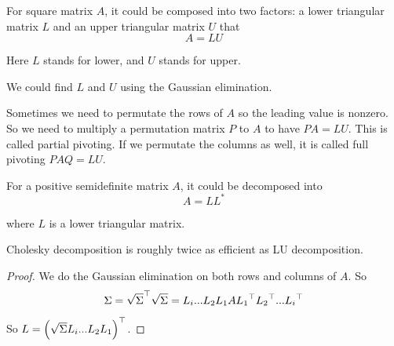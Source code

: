 \begin{theorem}
    For square matrix $A$, it could be composed into two factors: a lower triangular matrix $L$ and an upper triangular matrix $U$ that
    \begin{equation}
        A = LU
    \end{equation}
    
    Here $L$ stands for lower, and $U$ stands for upper.
    
    We could find $L$ and $U$ using the Gaussian elimination.
    
    Sometimes we need to permutate the rows of $A$ so the leading value is nonzero. So we need to multiply a permutation matrix $P$ to $A$ to have $PA = LU$. This is called partial pivoting. If we permutate the columns as well, it is called full pivoting $PAQ = LU$.
\end{theorem}

\begin{theorem}
    For a positive semidefinite matrix $A$, it could be decomposed into 
    \begin{equation}
        A = L L^*
    \end{equation}
    
    where $L$ is a lower triangular matrix.
    
    Cholesky decomposition is roughly twice as efficient as LU decomposition.
\end{theorem}
\begin{proof}
    We do the Gaussian elimination on both rows and columns of $A$. So 
    \begin{equation}
        \Sigma = {\sqrt{\Sigma}}^\top \sqrt{\Sigma} = L_i ... L_2 L_1 A {L_1}^\top {L_2}^\top ... {L_i}^\top
    \end{equation}
    
    So $L = \transpose{\mleft(\sqrt{\Sigma}L_i ... L_2 L_1\mright)}$.
\end{proof}

























